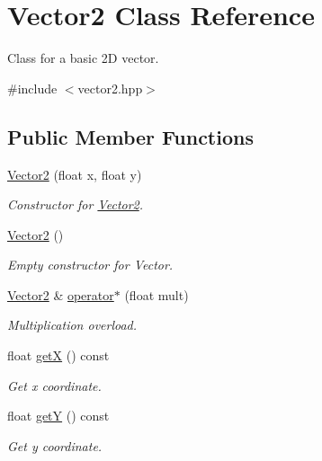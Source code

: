 \hypertarget{classVector2}{}\section{Vector2 Class Reference}
\label{classVector2}


Class for a basic 2D vector.  




{\ttfamily \#include $<$vector2.\+hpp$>$}

\subsection*{Public Member Functions}
\begin{DoxyCompactItemize}
\item 
\mbox{\hyperlink{classVector2_a061ab58a0e216c759d64e3746d712b12}{Vector2}} (float x, float y)
\begin{DoxyCompactList}\small\item\em Constructor for \mbox{\hyperlink{classVector2}{Vector2}}. \end{DoxyCompactList}\item 
\mbox{\label{classVector2_a22104d1809be26a419ef1f959e3761bf}} 
\mbox{\hyperlink{classVector2_a22104d1809be26a419ef1f959e3761bf}{Vector2}} ()
\begin{DoxyCompactList}\small\item\em Empty constructor for Vector. \end{DoxyCompactList}\item 
\mbox{\hyperlink{classVector2}{Vector2}} \& \mbox{\hyperlink{classVector2_a2b00999bdfe377965239a8f44d7c192c}{operator$\ast$}} (float mult)
\begin{DoxyCompactList}\small\item\em Multiplication overload. \end{DoxyCompactList}\item 
float \mbox{\hyperlink{classVector2_a808d02062efcc0c016491c04845e3e34}{getX}} () const
\begin{DoxyCompactList}\small\item\em Get x coordinate. \end{DoxyCompactList}\item 
float \mbox{\hyperlink{classVector2_a59bf838c0fc50305975e1679509fda83}{getY}} () const
\begin{DoxyCompactList}\small\item\em Get y coordinate. \end{DoxyCompactList}\end{DoxyCompactItemize}
